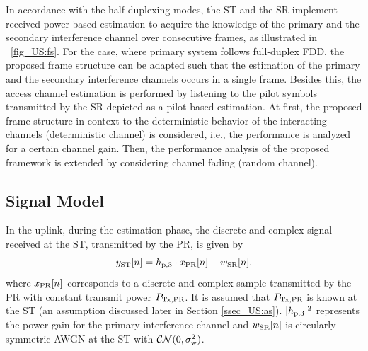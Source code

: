 In accordance with the half duplexing modes, the ST and the SR implement received power-based estimation to acquire the knowledge of the primary and the secondary interference channel over consecutive frames, as illustrated in \figurename~\ref{fig_US:fs}. For the case, where primary system follows full-duplex FDD, the proposed frame structure can be adapted such that the estimation of the primary and the secondary interference channels occurs in a single frame. Besides this, the access channel estimation is performed by listening to the pilot symbols transmitted by the SR depicted as a pilot-based estimation. 
At first, the proposed frame structure in context to the deterministic behavior of the interacting channels (deterministic channel) is considered, i.e., the performance is analyzed for a certain channel gain. Then, the performance analysis of the proposed framework is extended by considering channel fading (random channel). %




\subsection{Signal Model}
In the uplink, during the estimation phase, the discrete and complex signal received at the ST, transmitted by the PR, is given by
\begin{equation}
y_{\text{ST}}[n] = h_{\text{p,3}} \cdot x_{\text{PR}}[n] + w_{\text{SR}}[n],
\label{eq_US:sys_mod_st}
\end{equation}
where $x_{\text{PR}}[n]$ corresponds to a discrete and complex sample transmitted by the PR with constant transmit power $P_{\text{Tx,PR}}$. It is assumed that $P_{\text{Tx,PR}}$ is known at the ST (an assumption discussed later in Section \ref{ssec_US:as}). $|h_{\text{p,3}}|^2$ represents the power gain for the primary interference channel and $w_{\text{SR}}[n]$ is circularly symmetric AWGN at the ST with %
$\mathcal{CN}(0, \sigma^2_{\text{w}})$. %


